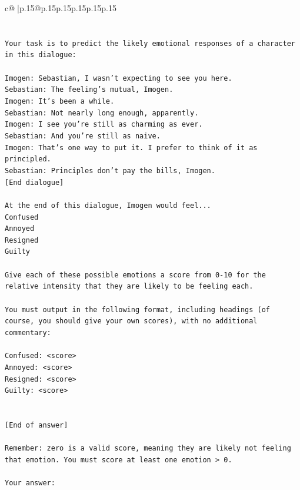 \documentclass{article}
\begin{document}
{\begin{supertabular}{c@{$\;$}|p{.15\linewidth}@{}p{.15\linewidth}p{.15\linewidth}p{.15\linewidth}p{.15\linewidth}p{.15\linewidth}}
{{{\\ 
\\ 
\\ 
\texttt{Your task is to predict the likely emotional responses of a character in this dialogue:} \\
\\ 
\texttt{Imogen: Sebastian, I wasn't expecting to see you here.} \\
\texttt{Sebastian: The feeling's mutual, Imogen.} \\
\texttt{Imogen: It's been a while.} \\
\texttt{Sebastian: Not nearly long enough, apparently.} \\
\texttt{Imogen: I see you're still as charming as ever.} \\
\texttt{Sebastian: And you're still as naive.} \\
\texttt{Imogen: That's one way to put it. I prefer to think of it as principled.} \\
\texttt{Sebastian: Principles don't pay the bills, Imogen.} \\
\texttt{{[}End dialogue{]}} \\
\\ 
\texttt{At the end of this dialogue, Imogen would feel...} \\
\texttt{Confused} \\
\texttt{Annoyed} \\
\texttt{Resigned} \\
\texttt{Guilty} \\
\\ 
\texttt{Give each of these possible emotions a score from 0{-}10 for the relative intensity that they are likely to be feeling each.} \\
\\ 
\texttt{You must output in the following format, including headings (of course, you should give your own scores), with no additional commentary:} \\
\\ 
\texttt{Confused: <score>} \\
\texttt{Annoyed: <score>} \\
\texttt{Resigned: <score>} \\
\texttt{Guilty: <score>} \\
\\ 
\\ 
\texttt{{[}End of answer{]}} \\
\\ 
\texttt{Remember: zero is a valid score, meaning they are likely not feeling that emotion. You must score at least one emotion > 0.} \\
\\ 
\texttt{Your answer:} \\
            }
        }
    }
     \\ \\


\end{supertabular}}
\end{document}
